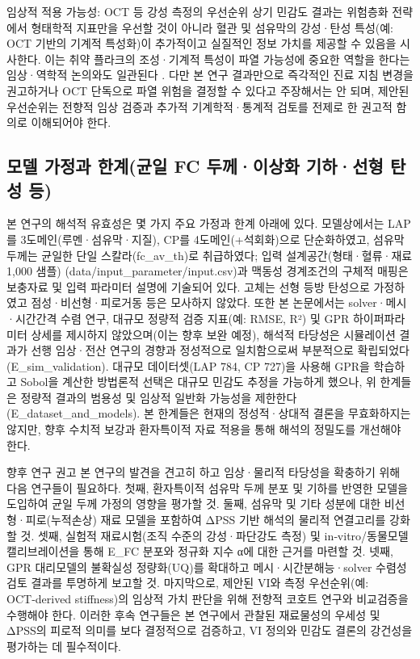 \documentclass[preprint,12pt]{elsarticle}
\begin{document}
임상적 적용 가능성: OCT 등 강성 측정의 우선순위
상기 민감도 결과는 위험층화 전략에서 형태학적 지표만을 우선할 것이 아니라 혈관 및 섬유막의 강성·탄성 특성(예: OCT 기반의 기계적 특성화)이 추가적이고 실질적인 정보 가치를 제공할 수 있음을 시사한다. 이는 취약 플라크의 조성·기계적 특성이 파열 가능성에 중요한 역할을 한다는 임상·역학적 논의와도 일관된다 \cite{stefanadis2017} \cite{brown2016}. 다만 본 연구 결과만으로 즉각적인 진료 지침 변경을 권고하거나 OCT 단독으로 파열 위험을 결정할 수 있다고 주장해서는 안 되며, 제안된 우선순위는 전향적 임상 검증과 추가적 기계학적·통계적 검토를 전제로 한 권고적 함의로 이해되어야 한다.

\subsection{모델 가정과 한계(균일 FC 두께·이상화 기하·선형 탄성 등)}
본 연구의 해석적 유효성은 몇 가지 주요 가정과 한계 아래에 있다. 모델상에서는 LAP를 3도메인(루멘·섬유막·지질), CP를 4도메인(+석회화)으로 단순화하였고, 섬유막 두께는 균일한 단일 스칼라(fc\_av\_th)로 취급하였다; 입력 설계공간(형태·혈류·재료 1,000 샘플) (data/input\_parameter/input.csv)과 맥동성 경계조건의 구체적 매핑은 보충자료 및 입력 파라미터 설명에 기술되어 있다. 고체는 선형 등방 탄성으로 가정하였고 점성·비선형·피로거동 등은 모사하지 않았다. 또한 본 논문에서는 solver·메시·시간간격 수렴 연구, 대규모 정량적 검증 지표(예: RMSE, R²) 및 GPR 하이퍼파라미터 상세를 제시하지 않았으며(이는 향후 보완 예정), 해석적 타당성은 시뮬레이션 결과가 선행 임상·전산 연구의 경향과 정성적으로 일치함으로써 부분적으로 확립되었다(E\_sim\_validation). 대규모 데이터셋(LAP 784, CP 727)을 사용해 GPR을 학습하고 Sobol을 계산한 방법론적 선택은 대규모 민감도 추정을 가능하게 했으나, 위 한계들은 정량적 결과의 범용성 및 임상적 일반화 가능성을 제한한다 (E\_dataset\_and\_models). 본 한계들은 현재의 정성적·상대적 결론을 무효화하지는 않지만, 향후 수치적 보강과 환자특이적 자료 적용을 통해 해석의 정밀도를 개선해야 한다.

향후 연구 권고
본 연구의 발견을 견고히 하고 임상·물리적 타당성을 확충하기 위해 다음 연구들이 필요하다. 첫째, 환자특이적 섬유막 두께 분포 및 기하를 반영한 모델을 도입하여 균일 두께 가정의 영향을 평가할 것. 둘째, 섬유막 및 기타 성분에 대한 비선형·피로(누적손상) 재료 모델을 포함하여 ΔPSS 기반 해석의 물리적 연결고리를 강화할 것. 셋째, 실험적 재료시험(조직 수준의 강성·파단강도 측정) 및 in‑vitro/동물모델 캘리브레이션을 통해 E\_FC 분포와 정규화 지수 α에 대한 근거를 마련할 것. 넷째, GPR 대리모델의 불확실성 정량화(UQ)를 확대하고 메시·시간분해능·solver 수렴성 검토 결과를 투명하게 보고할 것. 마지막으로, 제안된 VI와 측정 우선순위(예: OCT‑derived stiffness)의 임상적 가치 판단을 위해 전향적 코호트 연구와 비교검증을 수행해야 한다. 이러한 후속 연구들은 본 연구에서 관찰된 재료물성의 우세성 및 ΔPSS의 피로적 의미를 보다 결정적으로 검증하고, VI 정의와 민감도 결론의 강건성을 평가하는 데 필수적이다.
\end{document}
